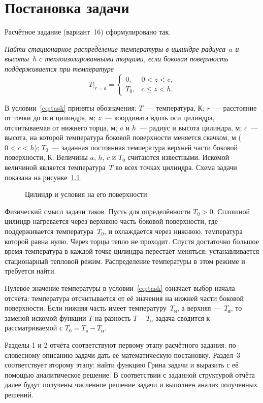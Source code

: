 \chapter{Постановка задачи}
\label{ch:task}

Расчётное задание (вариант~16) сформулировано так.

\emph{Найти стационарное распределение температуры в цилиндре радиуса~$a$
и высоты~$h$ с теплоизолированными торцами, если боковая поверхность
поддерживается при температуре}
\begin{equation}
\label{eq:task}
T\big|_{r=a}=
\begin{cases}
0,   & 0<z<c,\\[2pt]
T_0, & c\le z<h.
\end{cases}
\end{equation}

В условии~\eqref{eq:task} приняты обозначения: $T$~— температура, К;
$r$~— расстояние от точки до оси цилиндра, м; $z$~— координата вдоль оси
цилиндра, отсчитываемая от нижнего торца, м; $a$ и $h$~— радиус и высота
цилиндра, м; $c$~— высота, на которой температура боковой поверхности
меняется скачком, м ($0<c<h$); $T_0$~— заданная постоянная температура
верхней части боковой поверхности, К. Величины $a$, $h$, $c$ и $T_0$
считаются известными. Искомой величиной является температура~$T$ во всех
точках цилиндра. Схема задачи показана на рисунке~\ref{fig:cylinder}.

\begin{figure}[H]
  \centering
  
  \caption{Цилиндр и условия на его поверхности}
  \label{fig:cylinder}
\end{figure}

Физический смысл задачи таков. Пусть для определённости $T_0>0$. Сплошной
цилиндр нагревается через верхнюю часть боковой поверхности, где
поддерживается температура~$T_0$, и охлаждается через нижнюю, температура
которой равна нулю. Через торцы тепло не проходит. Спустя достаточно
большое время температура в каждой точке цилиндра перестаёт меняться:
устанавливается стационарный тепловой режим. Распределение температуры
в этом режиме и требуется найти.

Нулевое значение температуры в условии~\eqref{eq:task} означает выбор начала
отсчёта: температура отсчитывается от её значения на нижней части боковой
поверхности. Если нижняя часть имеет температуру~$T_{\text{н}}$,
а верхняя~— $T_{\text{в}}$, то заменой искомой функции $T$ на разность
$T-T_{\text{н}}$ задача сводится к рассматриваемой
с $T_0=T_{\text{в}}-T_{\text{н}}$.

Разделы 1 и 2 отчёта соответствуют первому этапу расчётного задания: по
словесному описанию задачи дать её математическую постановку. Раздел~3
соответствует второму этапу: найти функцию Грина задачи и выразить с её
помощью аналитическое решение. В соответствии с заданной структурой
отчёта далее будут получены численное решение задачи и выполнен анализ
полученных решений.
